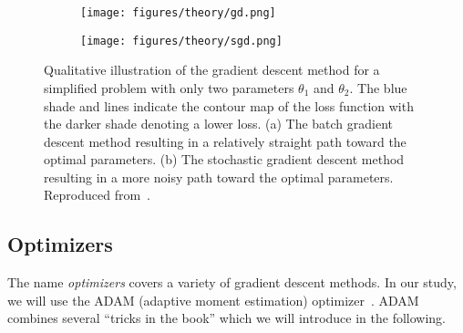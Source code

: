 \begin{figure}[!htb]
  \centering
  \begin{subfigure}[t]{0.49\textwidth}
    \centering
    \texttt{[image: figures/theory/gd.png]}
    \caption{}
    \label{fig:gd}
  \end{subfigure}
  \hfill
  \begin{subfigure}[t]{0.49\textwidth}
    \centering
    \texttt{[image: figures/theory/sgd.png]}
    \caption{}
    \label{fig:sgd}
  \end{subfigure}
  \hfill
  \caption{Qualitative illustration of the gradient descent method for a simplified problem with only two parameters $\theta_1$ and $\theta_2$. The blue shade and lines indicate the contour map of the loss function with the darker shade denoting a lower loss. (a) The batch gradient descent method resulting in a relatively straight path toward the optimal parameters. (b) The stochastic gradient descent method resulting in a more noisy path toward the optimal parameters. Reproduced from~\cite{grad_descent_analog}.}
  \label{fig:gradient_descent}
\end{figure}


\subsection{Optimizers}
The name \textit{optimizers} covers a variety of gradient descent methods. In our study, we will use the ADAM (adaptive moment estimation) optimizer~\cite{kingma2017adam}. ADAM combines several ``tricks in the book'' which we will introduce in the following.

